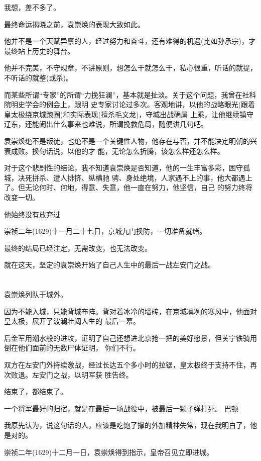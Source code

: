 \documentclass[11pt,a4paper,onecolumn]{article}
\begin{document}
我想，差不多了。

最终命运揭晓之前，袁崇焕的表现大致如此。

他并不是一个天赋异禀的人，经过努力和奋斗，还有难得的机遇(比如孙承宗)，才最终站上历史的舞台。

他并不完美，不守规章，不讲原则，想怎么干就怎么干，私心很重，听话的就提，不听话的就整(或杀)。

而某些所谓``专家''的所谓``力挽狂澜''，基本就是扯淡。关于这个问题，我曾在社科院明史学会的例会上，跟明
史专家讨论过多次。客观地讲，以他的战略眼光(跟着皇太极绕京城跑圈)和实际表现(擅杀毛文龙)，守城出战确属
上乘，让他继续镇守辽东，还能闹出什么事来也难说，所谓挽救危局，随便讲几句吧。

袁崇焕绝不是叛徒，也绝不是一个关键性人物，他存在与否，并不能决定明朝的兴衰成败。换句话说，以他的才
能，无论怎么折腾，该怎么样还怎么样。

对于这个悲剧性的结论，我不知道袁崇焕是否知道，他的一生丰富多彩，困守孤城，决死拼杀、遭人排挤、纵横驰
骋、身处绝境，人家遇不上的事，他大都遇上了。但无论何时、何地，得意、失意，他一直在努力，他坚信，自己
的努力终将改变一切。

他始终没有放弃过

崇祯二年(1629)十一月二十七日，京城九门换防，一切准备就绪。

最终的结局已经注定，无需改变，也无法改变。

就在这天，坚定的袁崇焕开始了自己人生中的最后一战\myrule 左安门之战。

\section[\thesection]{}

袁崇焕列队于城外。

因为不能入城，只能背城布阵。背对着冰冷的墙砖，在京城凛冽的寒风中，他面对皇太极，展开了波澜壮阔人生的
最后一幕。

后金军用潮水般的进攻，证明了自己还想进北京抢一把的美好愿景，但关宁铁骑用倒在他们面前的无数尸体证明，
你们不行。

双方在左安门外持续激战，经过长达五个多小时的拉锯，皇太极终于支持不住，再次败退。左安门之战，以明军获
胜告终。

结束了，都结束了。

一个将军最好的归宿，就是在最后一场战役中，被最后一颗子弹打死。 \myrule 巴顿

我原先认为，说这句话的人，应该是吃饱了撑的外加精神失常，现在我明白了，他是对的。

崇祯二年(1629)十二月一日，袁崇焕得到指示，皇帝召见立即进城。
\end{document}
